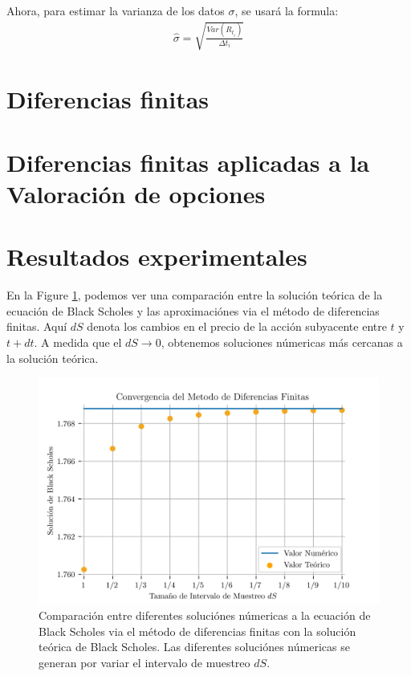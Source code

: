 \documentclass[]{elsarticle}
\begin{document}
Ahora, para estimar la varianza de los datos $\sigma$, se usará la formula: 
\begin{align}
	\hat{\sigma} = \sqrt{\frac{Var(R_{t_i})}{\Delta t_i}}
\end{align}



\section{Diferencias finitas}
\label{sec:bin_tree}


\section{Diferencias finitas aplicadas a la Valoración de opciones}
\label{sec:pricing}


\section{Resultados experimentales}
\label{sec:results}


En la Figure \ref{fig:convergencia}, podemos ver una comparación entre la solución teórica de la ecuación de Black Scholes y las aproximaciónes via el método de diferencias finitas. Aquí $dS$ denota los cambios en el precio de la acción subyacente entre $t$ y $t + dt$. A medida que el $dS \rightarrow 0$, obtenemos soluciones númericas más cercanas a la solución teórica. 

\begin{figure}[ht]
\centering
\includegraphics[width=\textwidth]{error.png}
\caption{Comparación entre diferentes soluciónes númericas a la ecuación de Black Scholes via el método de diferencias finitas con la solución teórica de Black Scholes. Las diferentes soluciónes númericas se generan por variar el intervalo de muestreo $dS$.}
\label{fig:convergencia}
\end{figure}
\end{document}
